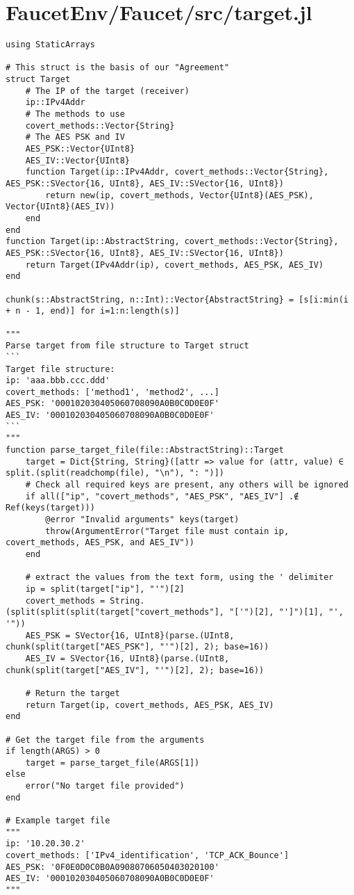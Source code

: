 \section{FaucetEnv/Faucet/src/target.jl}
\begin{lstlisting}[language=JuliaLocal, style=julia]
using StaticArrays

# This struct is the basis of our "Agreement"
struct Target
    # The IP of the target (receiver)
    ip::IPv4Addr
    # The methods to use
    covert_methods::Vector{String}
    # The AES PSK and IV
    AES_PSK::Vector{UInt8}
    AES_IV::Vector{UInt8}
    function Target(ip::IPv4Addr, covert_methods::Vector{String}, AES_PSK::SVector{16, UInt8}, AES_IV::SVector{16, UInt8})
        return new(ip, covert_methods, Vector{UInt8}(AES_PSK), Vector{UInt8}(AES_IV))
    end
end
function Target(ip::AbstractString, covert_methods::Vector{String}, AES_PSK::SVector{16, UInt8}, AES_IV::SVector{16, UInt8})
    return Target(IPv4Addr(ip), covert_methods, AES_PSK, AES_IV)
end

chunk(s::AbstractString, n::Int)::Vector{AbstractString} = [s[i:min(i + n - 1, end)] for i=1:n:length(s)]

"""
Parse target from file structure to Target struct
```
Target file structure:
ip: 'aaa.bbb.ccc.ddd'
covert_methods: ['method1', 'method2', ...]
AES_PSK: '000102030405060708090A0B0C0D0E0F'
AES_IV: '000102030405060708090A0B0C0D0E0F'
```
"""
function parse_target_file(file::AbstractString)::Target
    target = Dict{String, String}([attr => value for (attr, value) ∈ split.(split(readchomp(file), "\n"), ": ")])
    # Check all required keys are present, any others will be ignored
    if all(["ip", "covert_methods", "AES_PSK", "AES_IV"] .∉ Ref(keys(target)))
        @error "Invalid arguments" keys(target)
        throw(ArgumentError("Target file must contain ip, covert_methods, AES_PSK, and AES_IV"))
    end

    # extract the values from the text form, using the ' delimiter
    ip = split(target["ip"], "'")[2]
    covert_methods = String.(split(split(split(target["covert_methods"], "['")[2], "']")[1], "', '"))
    AES_PSK = SVector{16, UInt8}(parse.(UInt8, chunk(split(target["AES_PSK"], "'")[2], 2); base=16))
    AES_IV = SVector{16, UInt8}(parse.(UInt8, chunk(split(target["AES_IV"], "'")[2], 2); base=16))
    
    # Return the target
    return Target(ip, covert_methods, AES_PSK, AES_IV)
end

# Get the target file from the arguments
if length(ARGS) > 0
    target = parse_target_file(ARGS[1])
else
    error("No target file provided")
end

# Example target file
"""
ip: '10.20.30.2'
covert_methods: ['IPv4_identification', 'TCP_ACK_Bounce']
AES_PSK: '0F0E0D0C0B0A09080706050403020100'
AES_IV: '000102030405060708090A0B0C0D0E0F'
"""

\end{lstlisting}
